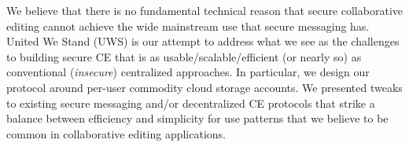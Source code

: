 \documentclass[runningheads]{llncs}
\begin{document}
We believe that there is no fundamental technical reason that secure collaborative editing cannot achieve the wide mainstream use that secure messaging has.
United We Stand (UWS) is our attempt to address what we see as the challenges to building secure CE that is as usable{\slash}scalable{\slash}efficient (or nearly so) as conventional (\emph{insecure}) centralized approaches.
In particular, we design our protocol around per-user commodity cloud storage accounts.
We presented tweaks to existing secure messaging and{\slash}or decentralized CE protocols that strike a balance between efficiency and simplicity for use patterns that we believe to be common in collaborative editing applications.




\end{document}
